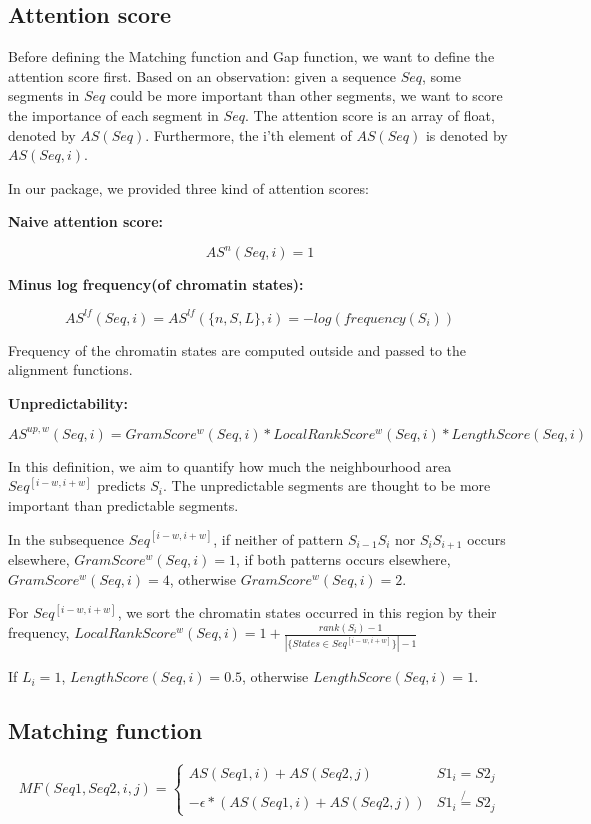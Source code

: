 \documentclass[a4paper]{article}
\begin{document}
\begin{CJK*}{UTF8}{kai}
\subsection{Attention score}

Before defining the Matching function and Gap function, we want to define the attention score first. Based on an observation: given a sequence $Seq$, some segments in $Seq$ could be more important than other segments, we want to score the importance of each segment in $Seq$. The attention score is an array of float, denoted by $AS(Seq)$. Furthermore, the i'th element of $AS(Seq)$ is denoted by $AS(Seq,i)$.

In our package, we provided three kind of attention scores:

\noindent
\textbf{Naive attention score:}

$$AS^n(Seq,i)=1$$

\noindent
\textbf{Minus log frequency(of chromatin states):}

$$AS^{lf}(Seq,i) = AS^{lf}(\{n,S,L\},i) = -log(frequency(S_i))$$

Frequency of the chromatin states are computed outside and passed to the alignment functions.

\noindent
\textbf{Unpredictability:}

$$AS^{up,w}(Seq,i) = GramScore^w(Seq,i)*LocalRankScore^w(Seq,i)*LengthScore(Seq,i)$$

In this definition, we aim to quantify how much the neighbourhood area $Seq^{[i-w,i+w]}$ predicts $S_{i}$. The unpredictable segments are thought to be more important than predictable segments.

In the subsequence $Seq^{[i-w,i+w]}$, if neither of pattern $S_{i-1} S_i$ nor $S_i S_{i+1}$ occurs elsewhere, $GramScore^w(Seq,i)=1$, if both patterns occurs elsewhere, $GramScore^w(Seq,i)=4$, otherwise $GramScore^w(Seq,i)=2$.

For $Seq^{[i-w,i+w]}$, we sort the chromatin states occurred in this region by their frequency, $LocalRankScore^w(Seq,i)=1+\frac{rank(S_i)-1}{|\{States\in Seq^{[i-w,i+w]}\}|-1}$

If $L_i=1$, $LengthScore(Seq,i)=0.5$, otherwise $LengthScore(Seq,i)=1$.


\subsection{Matching function}

$$MF(Seq1,Seq2,i,j) = \left\{ \begin{array}{cc}
AS(Seq1,i)+AS(Seq2,j)&S1_i=S2_j\\
-\epsilon*(AS(Seq1,i)+AS(Seq2,j))&S1_i\not{=}S2_j
\end{array}\right.$$


\end{CJK*}
\end{document}
